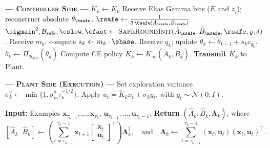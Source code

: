 \documentclass[11pt,journal,onecolumn]{IEEEtran}
\begin{document}
\begin{algorithm}
\begin{algorithmic}[1]
        \vspace{0.4em}
        \State \textbf{\textsc{--- Controller Side ---}}
        \State $\tilde K_k \gets K_0$
        \Else
            \State Receive Elias Gamma bits ($E$ and $z_i$); reconstruct absolute $\tilde{\theta}_{\ksafe}$.
            \State $\rsafe \gets \frac{1}{3\,\Csafe(\tilde A_{\ksafe},\tilde B_{\ksafe})}$ 
            \State $\sigmain^2, \mathcal{B}_{\mathrm{safe}}, \cslow, \cfast \gets \textsc{SafeRoundInit}(\tilde A_{\ksafe},\tilde B_{\ksafe}, \rsafe, \varrho, \delta)$.
        \Else
            \State Receive $m_k$; compute $s_k \gets m_k \cdot \sbase$. Receive $q_k$; update $\tilde{\theta}_k \gets \tilde{\theta}_{k-1} + s_k c_{q_k}$.
        \EndIf
        \State $\check{\theta}_k \gets \Pi_{\mathcal{B}_{\mathrm{safe}}}(\tilde{\theta}_k)$ 
        \State Compute CE policy $\tilde K_k \gets K_\infty(\check A_k,\check B_k)$. 
        \EndIf
        \State \textbf{Transmit} $\tilde K_k$ to Plant.

        \vspace{0.4em}
        \State \textbf{\textsc{--- Plant Side (Execution) ---}}
        \State Set exploration variance $\sigma_k^2 \gets \min\{1,\sigma_{\mathrm{in}}^2\tau_k^{-1/2}\}$.
        \State Apply $u_t = \tilde K_k x_t + \sigma_k g_t$, with $g_t\sim\mathcal{N}(0,I)$.
        \EndFor
        \EndFor
    \end{algorithmic}
\end{algorithm}

\begin{algorithm}
    \caption{OLS($k$)}
    \label{alg:ols}
    \begin{algorithmic}[1]
        \State \textbf{Input:} Examples $\mathbf{x}_{\tau_{k-1}}, \dots, \mathbf{x}_{\tau_k}$, $\mathbf{u}_{\tau_{k-1}}, \dots, \mathbf{u}_{\tau_k-1}$.
        \State \textbf{Return} $(\widehat{A}_k, \widehat{B}_k, \mathbf{\Lambda}_k)$, where
        \[
            \left[ \widehat{A}_k \;\; \widehat{B}_k \right] \leftarrow \left( \sum_{t=\tau_{k-1}}^{\tau_k-1} \mathbf{x}_{t+1} \begin{bmatrix} \mathbf{x}_t \\ \mathbf{u}_t \end{bmatrix}^\top \right) \mathbf{\Lambda}_k^\dagger, \quad \text{and} \quad \mathbf{\Lambda}_k \leftarrow \sum_{t=\tau_{k-1}}^{\tau_k-1} (\mathbf{x}_t, \mathbf{u}_t)(\mathbf{x}_t, \mathbf{u}_t)^\top.
        \]
    \end{algorithmic}
\end{algorithm}
\end{document}
